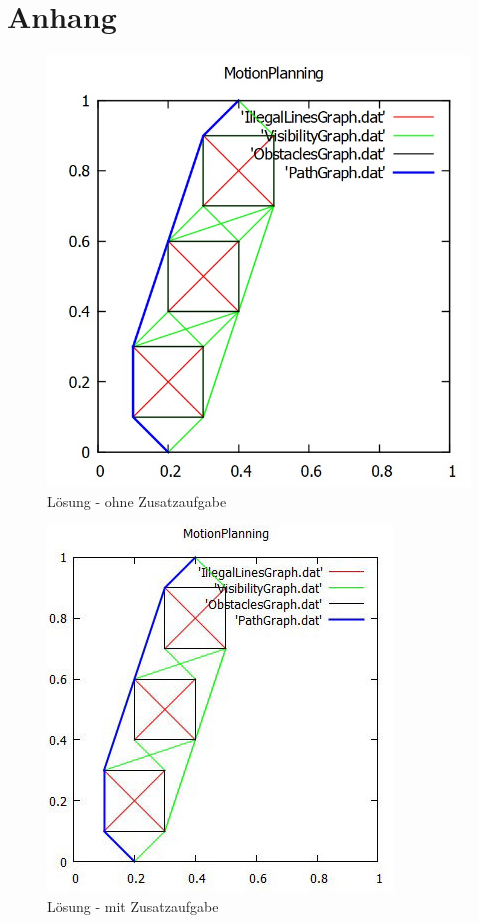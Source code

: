 \documentclass[a4paper]{scrartcl}
\begin{document}
\section*{Anhang}

\begin{figure}[h!]
	\includegraphics[height=0.4\textheight]{Visgraph.jpg}
	\caption{Lösung - ohne Zusatzaufgabe}
	\label{img:Lsg}
\end{figure}
\begin{figure}[h!]
\includegraphics[height=0.4\textheight]{Visgraph_reduced.jpg}
\caption{Lösung - mit Zusatzaufgabe}
\label{img:LsgZusatz}
\end{figure}
\end{document}
